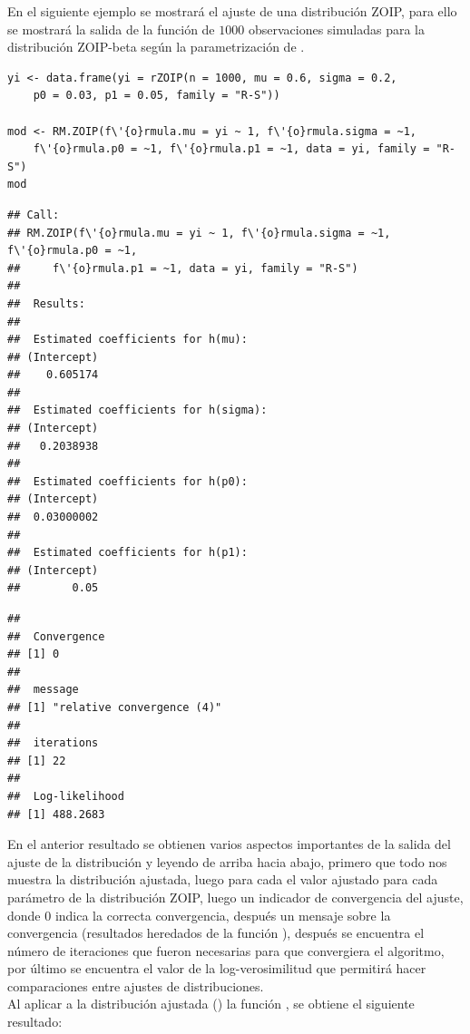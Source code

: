 En el siguiente ejemplo se mostrar\'{a} el ajuste de una distribuci\'{o}n ZOIP, para ello se mostrar\'{a} la salida de la funci\'{o}n  de $1000$ observaciones simuladas para la distribuci\'{o}n ZOIP-beta seg\'{u}n la parametrizaci\'{o}n de \cite{Stasinopoulos2}.\\

\begin{verbatim}
yi <- data.frame(yi = rZOIP(n = 1000, mu = 0.6, sigma = 0.2, 
    p0 = 0.03, p1 = 0.05, family = "R-S"))

mod <- RM.ZOIP(f\'{o}rmula.mu = yi ~ 1, f\'{o}rmula.sigma = ~1, 
    f\'{o}rmula.p0 = ~1, f\'{o}rmula.p1 = ~1, data = yi, family = "R-S")
mod
\end{verbatim}

\begin{verbatim}
## Call:
## RM.ZOIP(f\'{o}rmula.mu = yi ~ 1, f\'{o}rmula.sigma = ~1, f\'{o}rmula.p0 = ~1, 
##     f\'{o}rmula.p1 = ~1, data = yi, family = "R-S")
## 
##  Results: 
## 
##  Estimated coefficients for h(mu): 
## (Intercept) 
##    0.605174 
## 
##  Estimated coefficients for h(sigma): 
## (Intercept) 
##   0.2038938 
## 
##  Estimated coefficients for h(p0): 
## (Intercept) 
##  0.03000002 
## 
##  Estimated coefficients for h(p1): 
## (Intercept) 
##        0.05 
\end{verbatim}
\begin{verbatim}
## 
##  Convergence 
## [1] 0
## 
##  message 
## [1] "relative convergence (4)"
## 
##  iterations 
## [1] 22
## 
##  Log-likelihood 
## [1] 488.2683
\end{verbatim}

En el anterior resultado se obtienen varios aspectos importantes de la salida del ajuste de la distribuci\'{o}n y leyendo de arriba hacia abajo, primero que todo nos muestra la distribuci\'{o}n ajustada, luego para cada el valor ajustado para cada par\'{a}metro de la distribuci\'{o}n ZOIP, luego un indicador de convergencia del ajuste, donde 0 indica la correcta convergencia, despu\'{e}s un mensaje sobre la convergencia (resultados heredados de la funci\'{o}n ), despu\'{e}s se encuentra el n\'{u}mero de iteraciones que fueron necesarias para que convergiera el algoritmo, por \'{u}ltimo se encuentra el valor de la log-verosimilitud que permitir\'{a} hacer comparaciones entre ajustes de distribuciones.\\

Al aplicar a la distribuci\'{o}n ajustada () la funci\'{o}n , se obtiene el siguiente resultado:

